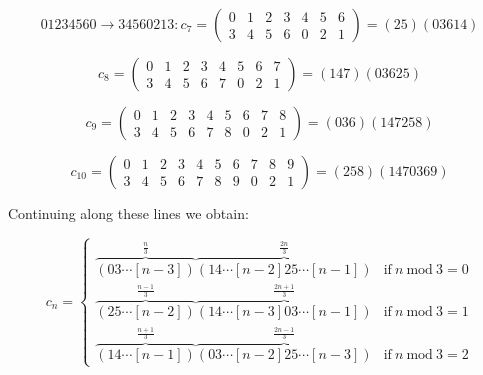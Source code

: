 \documentclass[a4paper,10pt]{article}
\begin{document}
\begin{equation}
01234560\rightarrow34560213:c_7=
\begin{pmatrix}
0&1&2&3&4&5&6\\
3&4&5&6&0&2&1
\end{pmatrix} = (25)(03614)
\end{equation}

\begin{equation}c_8=
\begin{pmatrix}
0&1&2&3&4&5&6&7\\
3&4&5&6&7&0&2&1
\end{pmatrix} = (147)(03625)
\end{equation}

\begin{equation}
c_9=
\begin{pmatrix}
0&1&2&3&4&5&6&7&8\\
3&4&5&6&7&8&0&2&1
\end{pmatrix} = (036)(147258)
\end{equation}

\begin{equation}
c_10=
\begin{pmatrix}
0&1&2&3&4&5&6&7&8&9\\
3&4&5&6&7&8&9&0&2&1
\end{pmatrix} = (258)(1470369)
\end{equation}

Continuing along these lines we obtain:

\begin{equation}
c_n = \left\{
\begin{array}{ll}
\overbrace{(03\cdots[n-3])}^{\frac{n}{3}}\overbrace{(14\cdots[n-2]25\cdots[n-1])}^{\frac{2n}{3}}&\textrm{if}~n~\textrm{mod}~3=0\\
\overbrace{(25\cdots[n-2])}^{\frac{n-1}{3}}\overbrace{(14\cdots[n-3]03\cdots[n-1])}^{\frac{2n+1}{3}} &\textrm{if}~n~\textrm{mod}~3=1\\
\overbrace{(14\cdots[n-1])}^{\frac{n+1}{3}}\overbrace{(03\cdots[n-2]25\cdots[n-3])}^{\frac{2n-1}{3}} &\textrm{if}~n~\textrm{mod}~3=2 
\end{array}
\right.
\end{equation}

% 
% 
% 
\end{document}
